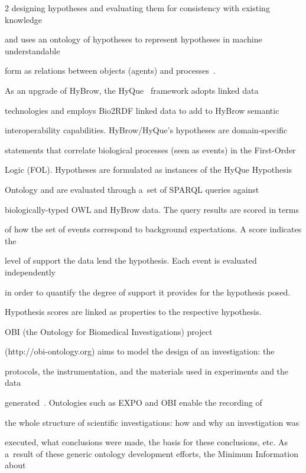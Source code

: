 \begin{multicols}{2}
designing hypotheses and evaluating them for consistency with existing knowledge


and uses an ontology of hypotheses to represent hypotheses in machine understandable


form as relations between objects (agents) and processes~\cite{45-kl}.





  As an upgrade of HyBrow, the HyQue~\cite{46-kl} framework adopts linked data


technologies and employs Bio2RDF linked data to add to HyBrow semantic


interoperability capabilities. HyBrow/HyQue's hypotheses are domain-specific


statements that correlate biological processes (seen as events) in the First-Order


Logic (FOL). Hypotheses are formulated as instances of the HyQue Hypothesis


Ontology and are evaluated through a~set of SPARQL queries against


  biologically-typed OWL and HyBrow data. The query results are scored in terms


of how the set of events correspond to background expectations. A score indicates the


level of support the data lend the hypothesis.  Each event is evaluated independently


in order to quantify the degree of support it provides for the hypothesis posed.


Hypothesis scores are linked as properties to the respective hypothesis.





  OBI (the Ontology for Biomedical Investigations) project


  ({\sf http://obi-ontology.org}) aims to model the design of an investigation: the


protocols, the instrumentation, and the materials used in experiments and the data


generated~\cite{47-kl}. Ontologies such as EXPO and OBI enable the recording of


the whole structure of scientific investigations: how and why an investigation was


executed, what conclusions were made, the basis for these conclusions, etc. As a~result of these generic ontology development efforts, the Minimum Information about



\end{multicols}
